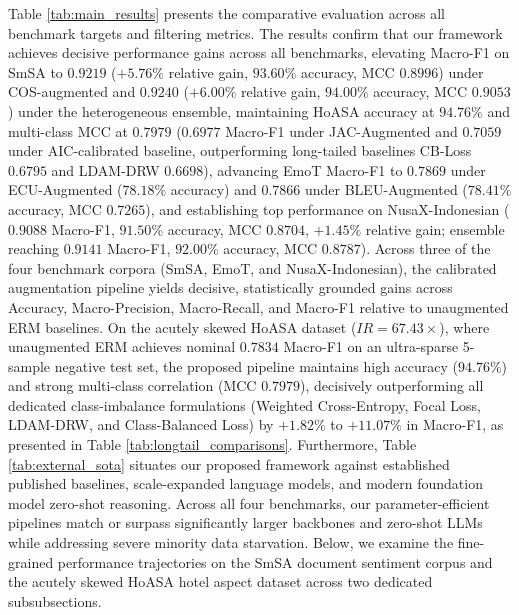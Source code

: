 \documentclass{ieeeaccess}
\begin{document}
Table \ref{tab:main_results} presents the comparative evaluation across all benchmark targets and filtering metrics. The results confirm that our framework achieves decisive performance gains across all benchmarks, elevating Macro-F1 on SmSA to \textbf{$0.9219$} ($+5.76\%$ relative gain, \textbf{$93.60\%$} accuracy, MCC \textbf{$0.8996$}) under COS-augmented and \textbf{$0.9240$} ($+6.00\%$ relative gain, \textbf{$94.00\%$} accuracy, MCC \textbf{$0.9053$}) under the heterogeneous ensemble, maintaining HoASA accuracy at \textbf{$94.76\%$} and multi-class MCC at \textbf{$0.7979$} ($0.6977$ Macro-F1 under JAC-Augmented and $0.7059$ under AIC-calibrated baseline, outperforming long-tailed baselines CB-Loss $0.6795$ and LDAM-DRW $0.6698$), advancing EmoT Macro-F1 to \textbf{$0.7869$} under ECU-Augmented ($78.18\%$ accuracy) and \textbf{$0.7866$} under BLEU-Augmented (\textbf{$78.41\%$} accuracy, MCC \textbf{$0.7265$}), and establishing top performance on NusaX-Indonesian ($0.9088$ Macro-F1, $91.50\%$ accuracy, MCC $0.8704$, $+1.45\%$ relative gain; ensemble reaching \textbf{$0.9141$} Macro-F1, \textbf{$92.00\%$} accuracy, MCC \textbf{$0.8787$}). Across three of the four benchmark corpora (SmSA, EmoT, and NusaX-Indonesian), the calibrated augmentation pipeline yields decisive, statistically grounded gains across Accuracy, Macro-Precision, Macro-Recall, and Macro-F1 relative to unaugmented ERM baselines. On the acutely skewed HoASA dataset ($IR=67.43\times$), where unaugmented ERM achieves nominal $0.7834$ Macro-F1 on an ultra-sparse 5-sample negative test set, the proposed pipeline maintains high accuracy ($94.76\%$) and strong multi-class correlation (MCC $0.7979$), decisively outperforming all dedicated class-imbalance formulations (Weighted Cross-Entropy, Focal Loss, LDAM-DRW, and Class-Balanced Loss) by $+1.82\%$ to $+11.07\%$ in Macro-F1, as presented in Table \ref{tab:longtail_comparisons}. Furthermore, Table \ref{tab:external_sota} situates our proposed framework against established published baselines, scale-expanded language models, and modern foundation model zero-shot reasoning. Across all four benchmarks, our parameter-efficient pipelines match or surpass significantly larger backbones and zero-shot LLMs while addressing severe minority data starvation. Below, we examine the fine-grained performance trajectories on the SmSA document sentiment corpus and the acutely skewed HoASA hotel aspect dataset across two dedicated subsubsections.
\end{document}
